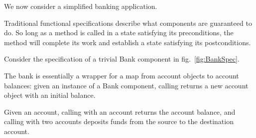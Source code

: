 We now consider a simplified banking application.  %


{}

Traditional functional specifications describe what components are
guaranteed to do. So long as a method is called in a state satisfying
its preconditions, the method will complete its work and establish a
state satisfying its postconditions.  


Consider the specification of a trivial Bank component in
fig.~\ref{fig:BankSpec}.  
{}

The bank is essentially a wrapper for a map
from account objects to account balances: given an instance of a Bank
component, calling  returns a new account object with
an initial balance. 

Given an account, calling  with an 
account returns the account balance, and calling  with
two accounts deposits funds from the source to the destination account.

